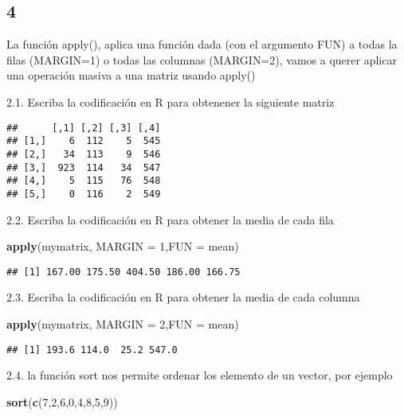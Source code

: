 \documentclass[]{article}
\newenvironment{Shaded}{\begin{snugshade}}{\end{snugshade}}
\newcommand{\KeywordTok}[1]{\textcolor[rgb]{0.13,0.29,0.53}{\textbf{#1}}}
\newcommand{\DataTypeTok}[1]{\textcolor[rgb]{0.13,0.29,0.53}{#1}}
\newcommand{\DecValTok}[1]{\textcolor[rgb]{0.00,0.00,0.81}{#1}}
\newcommand{\NormalTok}[1]{#1}
\begin{document}
\subsection{4}\label{section-3}

La función apply(), aplica una función dada (con el argumento FUN) a
todas la filas (MARGIN=1) o todas las columnas (MARGIN=2), vamos a
querer aplicar una operación masiva a una matriz usando apply()

2.1. Escriba la codificación en R para obtenener la siguiente matriz

\begin{verbatim}
##      [,1] [,2] [,3] [,4]
## [1,]    6  112    5  545
## [2,]   34  113    9  546
## [3,]  923  114   34  547
## [4,]    5  115   76  548
## [5,]    0  116    2  549
\end{verbatim}

2.2. Escriba la codificación en R para obtener la media de cada fila

\begin{Shaded}
\begin{Highlighting}[]
\KeywordTok{apply}\NormalTok{(mymatrix, }\DataTypeTok{MARGIN =} \DecValTok{1}\NormalTok{,}\DataTypeTok{FUN =}\NormalTok{ mean)}
\end{Highlighting}
\end{Shaded}

\begin{verbatim}
## [1] 167.00 175.50 404.50 186.00 166.75
\end{verbatim}

2.3. Escriba la codificación en R para obtener la media de cada columna

\begin{Shaded}
\begin{Highlighting}[]
\KeywordTok{apply}\NormalTok{(mymatrix, }\DataTypeTok{MARGIN =} \DecValTok{2}\NormalTok{,}\DataTypeTok{FUN =}\NormalTok{ mean)}
\end{Highlighting}
\end{Shaded}

\begin{verbatim}
## [1] 193.6 114.0  25.2 547.0
\end{verbatim}

2.4. la función sort nos permite ordenar los elemento de un vector, por
ejemplo

\begin{Shaded}
\begin{Highlighting}[]
\KeywordTok{sort}\NormalTok{(}\KeywordTok{c}\NormalTok{(}\DecValTok{7}\NormalTok{,}\DecValTok{2}\NormalTok{,}\DecValTok{6}\NormalTok{,}\DecValTok{0}\NormalTok{,}\DecValTok{4}\NormalTok{,}\DecValTok{8}\NormalTok{,}\DecValTok{5}\NormalTok{,}\DecValTok{9}\NormalTok{))}
\end{Highlighting}
\end{Shaded}
\end{document}
